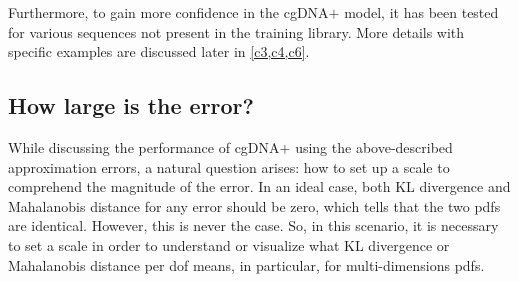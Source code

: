 Furthermore, to gain more confidence in the cgDNA$+$ model, it has been tested for various sequences not present in the training library.
More details with specific examples are discussed later in \cref{c3,c4,c6}.

\subsection{How large is the error?}\label{c2:s5sb4}
While discussing the performance of cgDNA$+$ using the above-described approximation errors, a natural question arises: how to set up a scale to comprehend the magnitude of the error.
In an ideal case, both KL divergence and Mahalanobis distance for any error should be zero, which tells that the two pdfs are identical. 
However, this is never the case. 
So, in this scenario, it is necessary to set a scale in order to understand
or visualize what KL divergence or Mahalanobis distance per dof means, in particular, for multi-dimensions pdfs.

